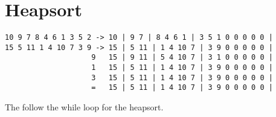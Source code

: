 \documentclass{article}
\begin{document}
\setcounter{section}{6}
\section{Heapsort}
\begin{verbatim}
10 9 7 8 4 6 1 3 5 2 -> 10 | 9 7 | 8 4 6 1 | 3 5 1 0 0 0 0 0 |
15 5 11 1 4 10 7 3 9 -> 15 | 5 11 | 1 4 10 7 | 3 9 0 0 0 0 0 |
                    9   15 | 9 11 | 5 4 10 7 | 3 1 0 0 0 0 0 |
                    1   15 | 5 11 | 1 4 10 7 | 3 9 0 0 0 0 0 |
                    3   15 | 5 11 | 1 4 10 7 | 3 9 0 0 0 0 0 |
                    =   15 | 5 11 | 1 4 10 7 | 3 9 0 0 0 0 0 |
\end{verbatim}

The follow the while loop for the heapsort.
\end{document}
